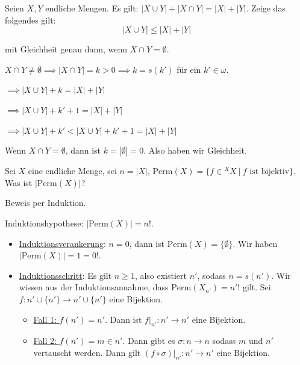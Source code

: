 \documentclass[12pt]{article}
\begin{document}
\begin{exercise}{}{}
    Seien $X, Y$ endliche Mengen. Es gilt: $|X \cup Y| + |X \cap Y| = |X |+ |Y|$. Zeige das folgendes gilt:
    $$
        |X \cup Y| \leq |X| + |Y|
    $$

    mit Gleichheit genau dann, wenn $X \cap Y = \emptyset$.
\end{exercise}

\begin{proofbox}
    $X \cap Y \neq \emptyset \implies |X \cap Y| = k > 0 \implies k = s(k')$ für ein $k' \in \omega$.
    
    $\implies |X \cup Y| + k = |X| + |Y|$

    $\implies |X \cup Y| + k' + 1 = |X| + |Y|$

    $\implies |X \cup Y| + k' < |X \cup Y| + k' + 1 = |X| + |Y|$

    Wenn $X \cap Y = \emptyset$, dann ist $k = |\emptyset| = 0$. Also haben wir Gleichheit.
\end{proofbox}

\begin{exercise}{}{}
    Sei $X$ eine endliche Menge, sei $n = |X|$, $\mathrm{Perm}(X) = \{ f \in {}^X X\ |\ f \text{ ist bijektiv} \}$. Was ist $|\mathrm{Perm}(X)|$?
\end{exercise}

\begin{proofbox}
    Beweis per Induktion.

    Induktionshypothese: $|\mathrm{Perm}(X)| = n!$.

    \begin{itemize}
        \item \underline{Induktionsverankerung}: $n = 0$, dann ist $\mathrm{Perm}(X) = \{\emptyset\}$. Wir haben $|\mathrm{Perm}(X)| = 1 = 0!$.
        \item \underline{Induktionsschritt}: Es gilt $n \geq 1$, also existiert $n'$, sodass $n = s(n')$. Wir wissen aus der Induktionsannahme, dass $\mathrm{Perm}(X_{n'}) = n'!$ gilt. Sei $f: n' \cup \{n'\} \rightarrow n' \cup \{n'\}$ eine Bijektion.
        \begin{itemize}
            \item \underline{Fall 1: $f(n') = n'$}. Dann ist $f|_{n'}: n' \rightarrow n'$ eine Bijektion.
            \item \underline{Fall 2: $f(n') = m \in n'$}. Dann gibt es $\sigma: n \rightarrow n$ sodass $m$ und $n'$ vertauscht werden. Dann gilt $(f \circ \sigma)|_{n'} : n' \rightarrow n'$ eine Bijektion.
        \end{itemize}
    \end{itemize}
\end{proofbox}
\end{document}
